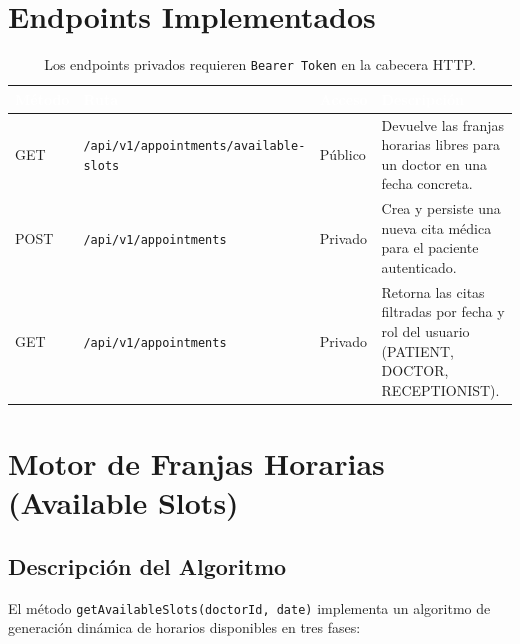 \documentclass[a4paper,12pt]{article}
\renewcommand{\arraystretch}{1.1}
\begin{document}
    \section{Endpoints Implementados}

    \begin{table}[H]
    \centering\small\renewcommand{\arraystretch}{1.5}
    \begin{tabular}{|p{1.4cm}|p{5.5cm}|p{1.6cm}|p{4.5cm}|}
    \hline
    \rowcolor{SKTPrimary}
    \textcolor{white}{\textbf{Método}} &
    \textcolor{white}{\textbf{Ruta}} &
    \textcolor{white}{\textbf{Acceso}} &
    \textcolor{white}{\textbf{Descripción}} \\
    \hline
    \rowcolor{rowGET}
    GET & \texttt{/api/v1/appointments/available-slots} & Público & Devuelve las franjas horarias libres para un doctor en una fecha concreta. \\
    \hline
    \rowcolor{rowPOST}
    POST & \texttt{/api/v1/appointments} & Privado & Crea y persiste una nueva cita médica para el paciente autenticado. \\
    \hline
    \rowcolor{rowGET}
    GET & \texttt{/api/v1/appointments} & Privado & Retorna las citas filtradas por fecha y rol del usuario (PATIENT, DOCTOR, RECEPTIONIST). \\
    \hline
    \end{tabular}
    \caption*{\footnotesize Los endpoints privados requieren \texttt{Bearer Token} en la cabecera HTTP.}
    \end{table}

    \section{Motor de Franjas Horarias (Available Slots)}

    \subsection{Descripción del Algoritmo}
    El método \texttt{getAvailableSlots(doctorId, date)} implementa un algoritmo de generación dinámica de horarios disponibles en tres fases:
\end{document}

